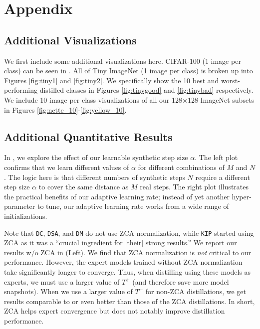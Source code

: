 \section{Appendix}\subsection{Additional Visualizations}
We first include some additional visualizations here. CIFAR-100 (1 image per class) can be seen in . 
All of Tiny ImageNet (1 image per class) is broken up into Figures \ref{fig:tiny1} and \ref{fig:tiny2}. We specifically show the 10 best and worst-performing distilled classes in Figures \ref{fig:tinygood} and \ref{fig:tinybad} respectively.
We include 10 image per class visualizations of all our 128$\times$128 ImageNet subsets in Figures \ref{fig:nette_10}-\ref{fig:yellow_10}.



\subsection{Additional Quantitative Results}


In , we explore the effect of our learnable synthetic step size $\alpha$. The left plot confirms that we learn different values of $\alpha$ for different combinations of $M$ and $N$. The logic here is that different numbers of synthetic steps $N$ require a different step size $\alpha$ to cover the same distance as $M$ real steps. The right plot illustrates the practical benefits of our adaptive learning rate; instead of yet another hyper-parameter to tune, our adaptive learning rate works from a wide range of initializations.



Note that \texttt{DC}, \texttt{DSA}, and \texttt{DM} do not use ZCA normalization, while \texttt{KIP} started using ZCA as it was a ``crucial ingredient for [their] strong results.'' We report our results w/o ZCA in  (Left).
We find that ZCA normalization is \textit{not} critical to our performance. 
However, the expert models trained without ZCA normalization take significantly longer to converge. Thus, when distilling using these models as experts, we must use a larger value of $T^+$ (and therefore save more model snapshots). When we use a larger value of $T^+$ for non-ZCA distillations, we get results comparable to or even better than those of the ZCA distillations.  
In short, ZCA helps expert convergence but does not notably improve distillation performance. 

